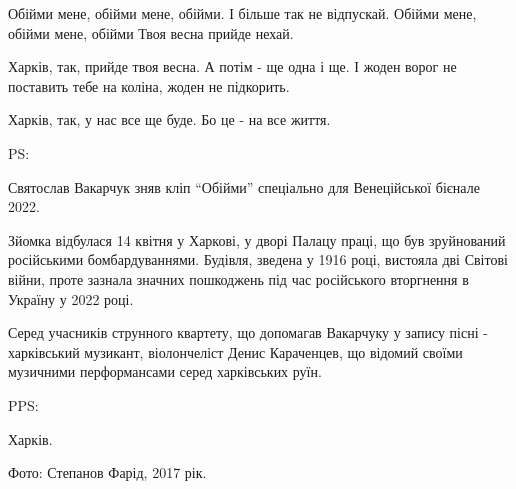 \obeycr
\noindent
Обійми мене, обійми мене, обійми. 
І більше так не відпускай.
Обійми мене, обійми мене, обійми
Твоя весна прийде нехай.
\restorecr

Харків, так, прийде твоя весна. А потім - ще одна і ще. І жоден ворог не
поставить тебе на коліна, жоден не підкорить. 

Харків, так, у нас все ще буде. Бо це - на все життя. 

PS:

Святослав Вакарчук зняв кліп \enquote{Обійми} спеціально для Венеційської бієнале 2022.

Зйомка відбулася 14 квітня у Харкові, у дворі Палацу праці, що був зруйнований
російськими бомбардуваннями. Будівля, зведена у 1916 році, вистояла дві Світові
війни, проте зазнала значних пошкоджень під час російського вторгнення в
Україну у 2022 році.

Серед учасників струнного квартету, що допомагав Вакарчуку у запису пісні -
харківський музикант, віолончеліст Денис Караченцев, що відомий своїми
музичними перформансами серед харківських руїн. 

PPS:

Харків. 

Фото: Степанов Фарід, 2017 рік.
